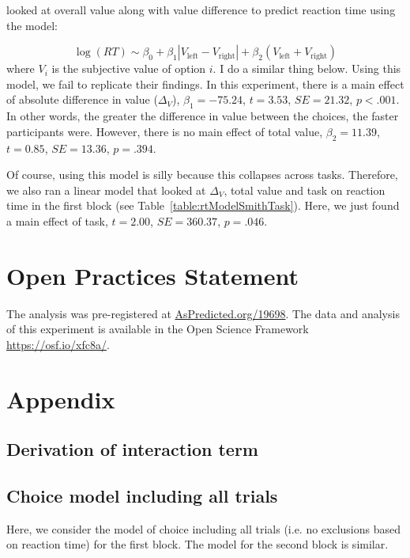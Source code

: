 \documentclass[12pt]{article}
\begin{document}
 looked at overall value along with value difference to predict reaction time using the model:

\begin{equation}
	\log(RT) \sim \beta_0 + \beta_1|V_\text{left} - V_\text{right}| + \beta_2(V_\text{left} + V_\text{right})
\end{equation}
where $V_i$ is the subjective value of option $i$. I do a similar thing below. Using this model, we fail to replicate their findings. In this experiment, there is a main effect of absolute difference in value ($\Delta_V$), $\beta_1=-75.24$, $t=3.53$, $SE=21.32$, $p<.001$. In other words, the greater the difference in value between the choices, the faster participants were. However, there is no main effect of total value, $\beta_2=11.39$, $t=0.85$, $SE=13.36$, $p=.394$.



Of course, using this model is silly because this collapses across tasks. Therefore, we also ran a linear model that looked at $\Delta_V$, total value and task on reaction time in the first block (see Table~\ref{table:rtModelSmithTask}). Here, we just found a main effect of task, $t=2.00$, $SE=360.37$, $p=.046$.


\clearpage
\section{Open Practices Statement}
The analysis was pre-registered at \url{AsPredicted.org/19698}. The data and analysis of this experiment is available in the Open Science Framework \url{https://osf.io/xfc8a/}. 


\clearpage
\section{Appendix}
\subsection{Derivation of interaction term}

\subsection{Choice model including all trials}
Here, we consider the model of choice including all trials (i.e. no exclusions based on reaction time) for the first block. The model for the second block is similar. 
\end{document}

